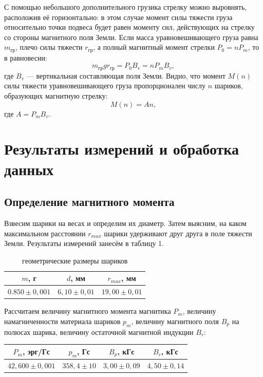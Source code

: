 \documentclass[a4paper]{article}
\theoremstyle{definition}
\theoremstyle{remark}
\begin{document}
С помощью небольшого дополнительного грузика стрелку можно выровнять, расположив её горизонтально: в этом случае момент силы тяжести груза относительно точки подвеса будет равен моменту сил, действующих на стрелку со стороны магнитного поля Земли. Если масса уравновешивающего груза равна $m_{\text{гр}}$, плечо силы тяжести $r_{\text{гр}}$, а полный магнитный момент стрелки $P_0 = nP_m$, то в равновесии: $$m_{\text{гр}}gr_{{\text{гр}}} = P_0B_v = nP_mB_v,$$ где $B_v$ --- вертикальная составляющая поля Земли. Видно, что момент $M(n)$ силы тяжести уравновешивающего груза пропорционален числу $n$ шариков, образующих магнитную стрелку: $$M(n) = An,$$ где $A = P_mB_v$.

\section{Результаты измерений и обработка данных}

\subsection{Определение магнитного момента}

Взвесим шарики на весах и определим их диаметр. Затем выясним, на каком максимальном расстоянии $r_{max}$ шарики удерживают друг друга в поле тяжести Земли. Результаты измерений занесём в таблицу 1.

\begin{table}[h!]
    \centering
    \begin{tabular}{|c|c|c|}
    \hline
    $m$, г            & $d$, мм          & $r_{max}$, мм      \\ \hline
    $0.850 \pm 0,001$ & $6,10 \pm 0,01$ & $19,00 \pm 0,01$ \\ \hline
    \end{tabular}
    \caption{геометрические размеры шариков}
    \end{table}


Рассчитаем величину магнитного момента магнитика $P_m$, величину намагниченности материала шариков $p_m$, величину магнитного поля $B_p$ на полюсах шарика, величину остаточной магнитной индукции $B_r$: 

\begin{table}[h!]
    \centering
    \begin{tabular}{|c|c|c|c|}
    \hline
    $P_m$, эрг/Гс       & $p_m$, Гс      & $B_p$, кГс       & $B_r$, кГс      \\ \hline
    $42,600 \pm  0,001$ & $358,4 \pm 10$ & $3,00 \pm 0,09 $ & $4,50 \pm 0,14$ \\ \hline
    \end{tabular}
    \end{table}
\end{document}
